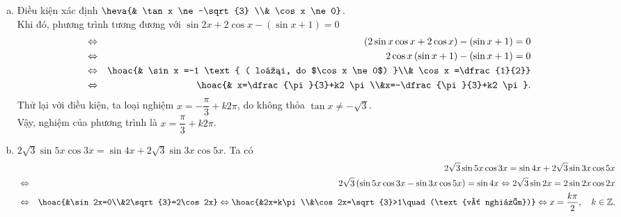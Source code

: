 \begin{bt}
{\begin{enumerate}[a)]
			\item Điều kiện xác định $\heva{& \tan x \ne -\sqrt{3} \\& \cos x \ne 0}$.\\ Khi đó, phương trình tương đương với $\sin 2x+ 2 \cos x - (\sin x +1)=0$
			      \begin{eqnarray*}
				      &\Leftrightarrow& (2 \sin x \cos x + 2 \cos x)- (\sin x +1)=0\\
				      &\Leftrightarrow& 2 \cos x\left( \sin x +1\right) - (\sin x +1)=0\\
				      &\Leftrightarrow& \hoac{& \sin x =-1 \text{ ( loại, do $\cos x \ne 0$) }\\& \cos x =\dfrac{1}{2}}\\
				      &\Leftrightarrow& \hoac{& x=\dfrac{\pi}{3}+k2 \pi\\&x=-\dfrac{\pi}{3}+k2 \pi}.
			      \end{eqnarray*}
			      Thử lại với điều kiện, ta loại nghiệm $x=-\dfrac{\pi}{3}+k2 \pi$, do không thỏa $\tan x \ne -\sqrt{3}$.\\
			      Vậy, nghiệm của phương trình là $x=\dfrac{\pi}{3}+k2 \pi$.
			\item $2\sqrt{3}\sin 5x\cos 3x=\sin 4x+2\sqrt{3}\sin 3x\cos 5x$.
			      Ta có \allowdisplaybreaks\begin{eqnarray*}
				      &&2\sqrt{3}\sin 5x\cos 3x=\sin 4x+2\sqrt{3}\sin 3x\cos 5x \\
				      & \Leftrightarrow& 2\sqrt{3}\left(\sin 5x\cos 3x-\sin 3x\cos 5x\right)=\sin 4x\Leftrightarrow 2\sqrt{3}\sin 2x=2\sin 2x\cos 2x  \\
				      & \Leftrightarrow&\hoac{&\sin 2x=0\\&2\sqrt{3}=2\cos 2x}\Leftrightarrow\hoac{&2x=k\pi\\&\cos 2x=\sqrt{3}>1\quad (\text{vô nghiệm})}\Leftrightarrow x=\dfrac{k\pi}{2}, \quad k \in \mathbb{Z}.
			      \end{eqnarray*}
		\end{enumerate}
	}
\end{bt} 
